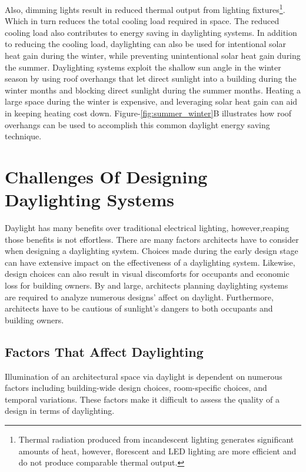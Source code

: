     Also, dimming lights result in reduced thermal output from lighting fixtures\footnote{Thermal radiation produced from incandescent lighting generates significant amounts of heat, however, florescent and LED lighting are more efficient and do not produce comparable thermal output.}. 
    Which in turn reduces the total cooling load required in space. The reduced cooling load also contributes to energy saving in daylighting systems\cite{Leslie}. 
    In addition to reducing the cooling load, daylighting can also be used for intentional solar heat gain during the winter, while preventing unintentional solar heat gain during the summer.
    Daylighting systems exploit the shallow sun angle in the winter season by using roof overhangs that let direct sunlight into a building during the winter months and blocking direct sunlight during the summer months. Heating a large space during the winter is expensive, and leveraging solar heat gain can aid in keeping heating cost down\cite{Bodart}. 
    Figure-\ref{fig:summer_winter}B illustrates how roof overhangs can be used to accomplish this common daylight energy saving technique.
    \\

\section{Challenges Of Designing Daylighting Systems}
  
  Daylight has many benefits over traditional electrical lighting, however,reaping those benefits is not effortless. There are many factors architects have to consider when designing a daylighting system. Choices made during the early design stage can have extensive impact on the effectiveness of a daylighting system. Likewise, design choices can also result in visual discomforts for occupants and economic loss for building owners. By and large, architects planning daylighting systems are required to analyze numerous designs' affect on daylight. Furthermore, architects have to be cautious of sunlight's dangers to both occupants and building owners.

  \subsection{Factors That Affect Daylighting}

    Illumination of an architectural space via daylight is dependent on numerous factors including building-wide design choices, room-specific choices, and temporal variations.
    These factors make it difficult to assess the quality of a design in terms of daylighting.\\

